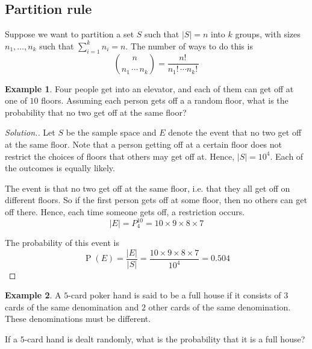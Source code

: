 \documentclass[11pt]{article}
\makeatletter
\theoremstyle{definition}
\newtheorem{eg}{Example}
\theoremstyle{remark}
\newenvironment{solution}{
    \let\oldqedsymbol=\qedsymbol%
    \def\@addpunct##1{}%
    \renewcommand{\qedsymbol}{$\blacktriangleleft$}%
    \begin{proof}[\textit Solution.]
}{
    \end{proof}%
    \renewcommand{\qedsymbol}{\oldqedsymbol}
}
\newcommand{\parens}[1]{\left(#1\right)}
\newcommand{\fact}{!\,}
\DeclareMathOperator{\Prob}{P}
\renewcommand{\P}[1]{\Prob{\parens{#1}}}
\makeatother
\begin{document}
\subsection{Partition rule}
\label{sec:partition-rule}

Suppose we want to partition a set $S$ such that $|S| = n$ into $k$ groups,
with sizes $n_1, \ldots, n_k$ such that $\sum_{i=1}^k n_i = n$. The number of
ways to do this is
\begin{equation}
    \label{eq:partition-rule}
    {n \choose n_1 \, \cdots \, n_k}
    = \frac{n\fact}{n_1\fact \cdots n_k\fact}
\end{equation}

\begin{eg}
    Four people get into an elevator, and each of them can get off at one of
    $10$ floors. Assuming each person gets off a a random floor, what is the
    probability that no two get off at the same floor?
\end{eg}

\begin{solution}
    Let $S$ be the sample space and $E$ denote the event that no two get off at
    the same floor. Note that a person getting off at a certain floor does not
    restrict the choices of floors that others may get off at.
    Hence, $|S| = 10^4$. Each of the outcomes is equally likely.

    The event is that no two get off at the same floor, i.e. that they all get
    off on different floors. So if the first person gets off at some floor,
    then no others can get off there. Hence, each time someone gets off, a
    restriction occurs.
    \begin{equation*}
        |E| = P_4^{10} = 10 \times 9 \times 8 \times 7
    \end{equation*}

    The probability of this event is
    \begin{equation*}
        \P{E}
        = \frac{|E|}{|S|} = \frac{10 \times 9 \times 8 \times 7}{10^4}
        = 0.504
    \end{equation*}
\end{solution}

\begin{eg}
    A $5$-card poker hand is said to be a full house if it consists of $3$
    cards of the same denomination and $2$ other cards of the same
    denomination. These denominations must be different.

    If a $5$-card hand is dealt randomly, what is the probability that it is a
    full house?
\end{eg}
\end{document}
